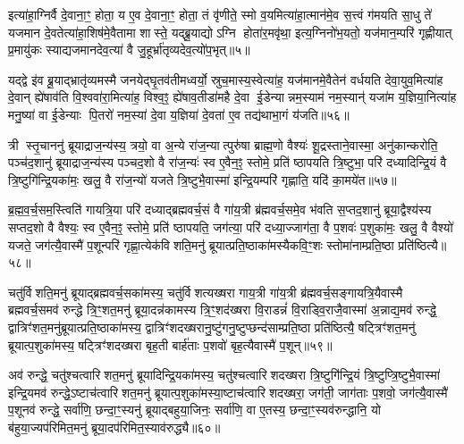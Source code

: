 इत्या॑हा॒ग्निर्वै दे॒वाना॒ꣳ॒ होता॒ य ए॒व दे॒वाना॒ꣳ॒ होता॒ तं वृ॑णीते॒ स्मो व॒यमित्या॑हा॒त्मान॑मे॒व स॒त्त्वं ग॑मयति सा॒धु ते॑ यजमान दे॒वतेत्या॑हा॒शिष॑मे॒वैतामा शास्ते॒ यद्ब्रू॒याद्योऽग्नि होता॑र॒मवृ॑था॒ इत्य॒ग्निनो॑भ॒यतो॒ यज॑मान॒म्परि॑ गृह्णीयात् प्र॒मायु॑कः स्याद्यजमानदेव॒त्या॑ वै जु॒हूर्भ्रा॑तृव्यदेव॒त्यो॑प॒भृत्॥५॥

यद्द्वे इ॑व ब्रू॒याद्भ्रातृ॑व्यमस्मै जनयेद्घृ॒तव॑तीमध्वर्यो॒ स्रुच॒मास्य॒स्वेत्या॑ह॒ यज॑मानमे॒वैतेन॑ वर्धयति देवा॒युव॒मित्या॑ह दे॒वान् ह्ये॑षाव॑ति वि॒श्ववा॑रा॒मित्या॑ह॒ विश्व॒ꣵ॒ ह्ये॑षाव॒तीडा॑महै दे॒वा ई॒डेन्यान्नम॒स्याम॑ नम॒स्यान्॑ यजा॑म य॒ज्ञिया॒नित्या॑ह मनु॒ष्या॑ वा ई॒डेन्याः पि॒तरो॑ नम॒स्या॑ दे॒वा य॒ज्ञिया॑ दे॒वता॑ ए॒व तद्य॑थाभा॒गं य॑जति॥५६॥

{\anuvakamend[{विप्रा॑नुमदित॒ इत्या॑ह च॒नास्मै॒ होतो॑प॒भृद्दे॒वता॑ ए॒व त्रीणि॑ च॥९॥}]}

त्री स्तृ॒चाननु॑ ब्रूयाद्राज॒न्य॑स्य॒ त्रयो॒ वा अ॒न्ये रा॑ज॒न्यात्पुरु॑षा ब्राह्म॒णो वैश्यः॑ शू॒द्रस्ताने॒वास्मा॒ अनु॑कान्करोति॒ पञ्च॑द॒शानु॑ ब्रूयाद्राज॒न्य॑स्य पञ्चद॒शो वै रा॑ज॒न्यः॑ स्व ए॒वैन॒ꣵ॒ स्तोमे॒ प्रति॑ ष्ठापयति त्रि॒ष्टुभा॒ परि॑ दध्यादिन्द्रि॒यं वै त्रि॒ष्टुगि॑न्द्रि॒यका॑मः॒ खलु॒ वै रा॑ज॒न्यो॑ यजते त्रि॒ष्टुभै॒वास्मा॑ इन्द्रि॒यम्परि॑ गृह्णाति॒ यदि॑ का॒मये॑त॥५७॥

ब्र॒ह्म॒व॒र्च॒सम॒स्त्विति॑ गायत्रि॒या परि॑ दध्याद्ब्रह्मवर्च॒सं वै गा॑य॒त्री ब्र॑ह्मवर्च॒समे॒व भ॑वति स॒प्तद॒शानु॑ ब्रूया॒द्वैश्य॑स्य सप्तद॒शो वै वैश्यः॒ स्व ए॒वैन॒ꣵ॒ स्तोमे॒ प्रति॑ ष्ठापयति॒ जग॑त्या॒ परि॑ दध्या॒ज्जाग॑ता॒ वै प॒शवः॑ प॒शुका॑मः॒ खलु॒ वै वैश्यो॑ यजते॒ जग॑त्यै॒वास्मै॑ प॒शून्परि॑ गृह्णा॒त्येक॑विशति॒मनु॑ ब्रूयात्प्रति॒ष्ठाका॑मस्यैकवि॒ꣳ॒शः स्तोमा॑नाम्प्रति॒ष्ठा प्रति॑ष्ठित्यै॥५८॥

चतु॑र्विशति॒मनु॑ ब्रूयाद्ब्रह्मवर्च॒सका॑मस्य॒ चतु॑र्विशत्यख्षरा गाय॒त्री गा॑य॒त्री ब्र॑ह्मवर्च॒सङ्गायत्रि॒यैवास्मै ब्रह्मवर्च॒समव॑ रुन्द्धे त्रि॒ꣳ॒शत॒मनु॑ ब्रूया॒दन्न॑कामस्य त्रि॒ꣳ॒शद॑ख्षरा वि॒राडन्नं॑ वि॒राड्वि॒राजै॒वास्मा॑ अ॒न्नाद्य॒मव॑ रुन्द्धे॒ द्वात्रिꣳ॑शत॒मनु॑ब्रूयात्प्रति॒ष्ठाका॑मस्य॒ द्वात्रिꣳ॑शदख्षरानु॒ष्टु॑गनु॒ष्टुप्छन्द॑साम्प्रति॒ष्ठा प्रति॑ष्ठित्यै॒ षट्त्रिꣳ॑शत॒मनु॑ ब्रूयात्प॒शुका॑मस्य॒ षट्त्रिꣳ॑शदख्षरा बृह॒ती बार्\mbox{}ह॑ताः प॒शवो॑ बृह॒त्यैवास्मै॑ प॒शून्॥५९॥

अव॑ रुन्द्धे॒ चतु॑श्चत्वारिशत॒मनु॑ ब्रूयादिन्द्रि॒यका॑मस्य॒ चतु॑श्चत्वारिशदख्षरा त्रि॒ष्टुगि॑न्द्रि॒यं त्रि॒ष्टुप्त्रि॒ष्टुभै॒वास्मा॑ इन्द्रि॒यमव॑ रुन्द्धे॒ऽष्टाच॑त्वारिशत॒मनु॑ ब्रूयात्प॒शुका॑मस्या॒ष्टाच॑त्वारिशदख्षरा॒ जग॑ती॒ जाग॑ताः प॒शवो॒ जग॑त्यै॒वास्मै॑ प॒शूनव॑ रुन्द्धे॒ सर्वा॑णि॒ छन्दा॒ꣳ॒स्यनु॑ ब्रूयाद्बहुया॒जिनः॒ सर्वा॑णि॒ वा ए॒तस्य॒ छन्दा॒ꣳ॒स्यव॑रुन्द्धानि॒ यो ब॑हुया॒ज्यप॑रिमित॒मनु॑ ब्रूया॒दप॑रिमित॒स्याव॑रुद्ध्यै॥६०॥

